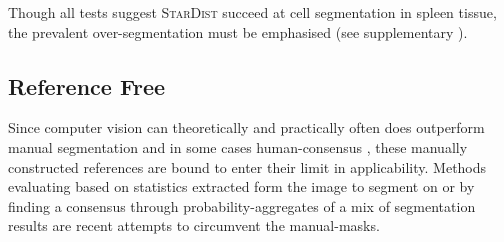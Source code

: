 Though all tests suggest \textsc{StarDist} succeed at cell segmentation in spleen tissue, the prevalent over-segmentation must be emphasised (see supplementary ).
\subsection*{Reference Free}
Since computer vision can theoretically and practically often does outperform manual segmentation and in some cases human-consensus \cite{pachitariu_cellpose-sam_2025}, these manually constructed references are bound to enter their limit in applicability. Methods evaluating based on statistics extracted form the image to segment on \cite{chen_evaluation_2023} or by finding a consensus through probability-aggregates of a mix of segmentation results \cite{sims_seg_2023} are recent attempts to circumvent the manual-masks.
